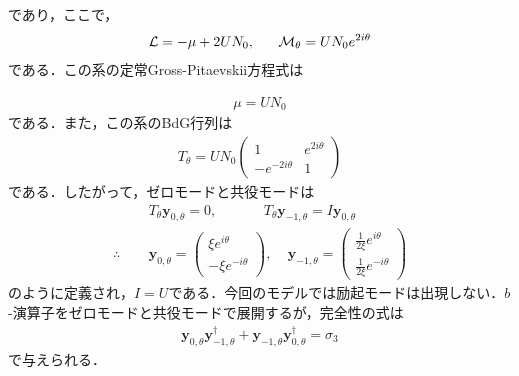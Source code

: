 \documentclass[10.5pt,a4paper]{jreport}
\begin{document}
であり，ここで，
\begin{eqnarray}
  {\cal L} = -\mu +2UN_0, \ \ \ \ \ {\cal M_\theta} = UN_0e^{2i\theta}
\end{eqnarray}
である．この系の定常Gross-Pitaevskii方程式は

\begin{eqnarray}
  \mu = UN_0\label{GP2}
\end{eqnarray}
である．また，この系のBdG行列は
\begin{eqnarray}
  T_{\theta} = UN_0
  \begin{pmatrix}
    1 & e^{2i\theta}  \\
    -e^{-2i\theta} & 1 
  \end{pmatrix}
\end{eqnarray}
である．したがって，ゼロモードと共役モードは
\begin{eqnarray}
  &&T_\theta\bm{y}_{0,\theta} = 0,\ \ \ \ \ \ \ \ \ \ \ \ \ \ \ T_\theta\bm{y}_{-1,\theta} = I\bm{y}_{0,\theta}\\
  \therefore\ \ &&\bm{y}_{0,\theta} = 
  \begin{pmatrix}
    \xi e^{i\theta} \\
    -\xi e^{-i\theta} 
  \end{pmatrix},\ \ \ \ \ 
  \bm{y}_{-1,\theta} = 
  \begin{pmatrix}
    \frac{1}{2\xi}e^{i\theta} \\
    \frac{1}{2\xi}e^{-i\theta} 
  \end{pmatrix}\label{zero_ajoint}
\end{eqnarray}
のように定義され，$I=U$である．今回のモデルでは励起モードは出現しない．$b$-演算子をゼロモードと共役モードで展開するが，完全性の式は
\begin{eqnarray}
  \bm{y}_{0,\theta}\bm{y}^\dagger_{-1,\theta} + \bm{y}_{-1,\theta}\bm{y}^\dagger_{0,\theta} = \sigma_3\label{completeness}
\end{eqnarray}
で与えられる．
\end{document}
